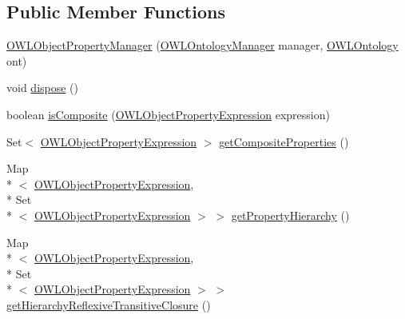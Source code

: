 \subsection*{Public Member Functions}
\begin{DoxyCompactItemize}
\item 
\hyperlink{classorg_1_1semanticweb_1_1owlapi_1_1util_1_1_o_w_l_object_property_manager_a0c11215d5d9e7b4bbfacb46c1a983d02}{O\-W\-L\-Object\-Property\-Manager} (\hyperlink{interfaceorg_1_1semanticweb_1_1owlapi_1_1model_1_1_o_w_l_ontology_manager}{O\-W\-L\-Ontology\-Manager} manager, \hyperlink{interfaceorg_1_1semanticweb_1_1owlapi_1_1model_1_1_o_w_l_ontology}{O\-W\-L\-Ontology} ont)
\item 
void \hyperlink{classorg_1_1semanticweb_1_1owlapi_1_1util_1_1_o_w_l_object_property_manager_a29b5b5cff38d2173585fe073b5d04d06}{dispose} ()
\item 
boolean \hyperlink{classorg_1_1semanticweb_1_1owlapi_1_1util_1_1_o_w_l_object_property_manager_aeac9d65e6106339e8b0905c8a4d027e3}{is\-Composite} (\hyperlink{interfaceorg_1_1semanticweb_1_1owlapi_1_1model_1_1_o_w_l_object_property_expression}{O\-W\-L\-Object\-Property\-Expression} expression)
\item 
Set$<$ \hyperlink{interfaceorg_1_1semanticweb_1_1owlapi_1_1model_1_1_o_w_l_object_property_expression}{O\-W\-L\-Object\-Property\-Expression} $>$ \hyperlink{classorg_1_1semanticweb_1_1owlapi_1_1util_1_1_o_w_l_object_property_manager_ad3011698e185a3420a17b5a0b29ba926}{get\-Composite\-Properties} ()
\item 
Map\\*
$<$ \hyperlink{interfaceorg_1_1semanticweb_1_1owlapi_1_1model_1_1_o_w_l_object_property_expression}{O\-W\-L\-Object\-Property\-Expression}, \\*
Set\\*
$<$ \hyperlink{interfaceorg_1_1semanticweb_1_1owlapi_1_1model_1_1_o_w_l_object_property_expression}{O\-W\-L\-Object\-Property\-Expression} $>$ $>$ \hyperlink{classorg_1_1semanticweb_1_1owlapi_1_1util_1_1_o_w_l_object_property_manager_a67c2650f48230a6f360df51424fdff1d}{get\-Property\-Hierarchy} ()
\item 
Map\\*
$<$ \hyperlink{interfaceorg_1_1semanticweb_1_1owlapi_1_1model_1_1_o_w_l_object_property_expression}{O\-W\-L\-Object\-Property\-Expression}, \\*
Set\\*
$<$ \hyperlink{interfaceorg_1_1semanticweb_1_1owlapi_1_1model_1_1_o_w_l_object_property_expression}{O\-W\-L\-Object\-Property\-Expression} $>$ $>$ \hyperlink{classorg_1_1semanticweb_1_1owlapi_1_1util_1_1_o_w_l_object_property_manager_ac90c63cce49b0d5fe9ad32c1f0cc311f}{get\-Hierarchy\-Reflexive\-Transitive\-Closure} ()

\end{DoxyCompactItemize}
